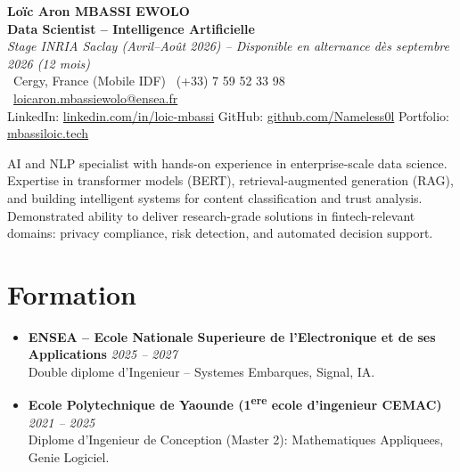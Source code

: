 \documentclass[a4paper,11pt]{article}
\begin{document}
\begin{center}
    {\Large \textbf{Lo\"ic Aron MBASSI EWOLO}} \\ \vspace{4pt}
    \textbf{\large Data Scientist -- Intelligence Artificielle} \\
    \textit{\small Stage INRIA Saclay (Avril--Ao\^ut 2026) -- Disponible en alternance d\`es septembre 2026 (12 mois)} \\ \vspace{4pt}
    \small
    \Pointinghand\ Cergy, France (Mobile IDF) \quad
    \Mobilefone\ (+33) 7 59 52 33 98 \quad
    {\color{primary}\Letter\ \href{mailto:loicaron.mbassiewolo@ensea.fr}{loicaron.mbassiewolo@ensea.fr}} \\ \vspace{2pt}
    {\color{primary}LinkedIn: \href{https://www.linkedin.com/in/loic-mbassi/}{linkedin.com/in/loic-mbassi}} \quad
    {\color{primary}GitHub: \href{https://github.com/Nameless0l}{github.com/Nameless0l}} \quad
    {\color{primary}Portfolio: \href{https://mbassiloic.tech}{mbassiloic.tech}}
\end{center}
\vspace{-6pt}

\noindent\small{AI and NLP specialist with hands-on experience in enterprise-scale data science. Expertise in transformer models (BERT), retrieval-augmented generation (RAG), and building intelligent systems for content classification and trust analysis. Demonstrated ability to deliver research-grade solutions in fintech-relevant domains: privacy compliance, risk detection, and automated decision support.}

\section{Formation}
\begin{itemize}[leftmargin=*, label=\tiny$\bullet$, nosep]
    \item \textbf{ENSEA -- Ecole Nationale Superieure de l'Electronique et de ses Applications} \hfill \textit{2025 -- 2027} \\
    \small{Double diplome d'Ingenieur -- Systemes Embarques, Signal, IA.}
    \item \textbf{Ecole Polytechnique de Yaounde (1\textsuperscript{ere} ecole d'ingenieur CEMAC)} \hfill \textit{2021 -- 2025} \\
    \small{Diplome d'Ingenieur de Conception (Master 2): Mathematiques Appliquees, Genie Logiciel.}
\end{itemize}
\end{document}
